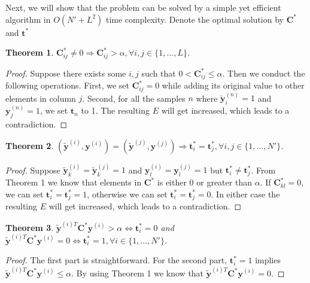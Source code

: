 \documentclass[10pt,twocolumn,letterpaper]{article}
\def\vec{\mathbf}
\def\mat{\mathbf}
\newtheorem{theorem}{Theorem}
\begin{document}
Next, we will show that the problem can be solved by a simple yet efficient algorithm in $O(N'+L^2)$ time complexity. Denote the optimal solution by $\mat{C}^*$ and $\vec{t}^*$
\begin{theorem}
$\mat{C}^*_{ij} \neq 0 \Rightarrow \mat{C}^*_{ij} > \alpha, \forall i,j \in \{1,\dots,L\}$.
\end{theorem}
\begin{proof}
Suppose there exists some $i,j$ such that $0 < \mat{C}^*_{ij} \leq \alpha$. Then we conduct the following operations. First, we set $\mat{C}^*_{ij}=0$ while adding its original value to other elements in column $j$. Second, for all the samples $n$ where $\tilde{\vec{y}}^{(n)}_i=1$ and $\vec{y}^{(n)}_j=1$, we set $\vec{t}_n$ to 1. The resulting $E$ will get increased, which leads to a contradiction.
\end{proof}
\begin{theorem}
$(\tilde{\vec{y}}^{(i)},\vec{y}^{(i)})=(\tilde{\vec{y}}^{(j)},\vec{y}^{(j)}) \Rightarrow \vec{t}^*_i=\vec{t}^*_j, \forall i,j \in \{1,\dots,N'\}$.
\end{theorem}
\begin{proof}
Suppose $\tilde{\vec{y}}^{(i)}_k=\tilde{\vec{y}}^{(j)}_k=1$ and $\vec{y}^{(i)}_l=\vec{y}^{(j)}_l=1$ but $\vec{t}^*_i \neq \vec{t}^*_j$. From Theorem 1 we know that elements in $\mat{C}^*$ is either 0 or greater than $\alpha$. If $\mat{C}^*_{kl}=0$, we can set $\vec{t}^*_i=\vec{t}^*_j=1$, otherwise we can set $\vec{t}^*_i=\vec{t}^*_j=0$. In either case the resulting $E$ will get increased, which leads to a contradiction.
\end{proof}
\begin{theorem}
$\tilde{\vec{y}}^{(i)T} \mat{C}^* \vec{y}^{(i)} > \alpha \Leftrightarrow \vec{t}^*_i=0$ and $\tilde{\vec{y}}^{(i)T} \mat{C}^* \vec{y}^{(i)} = 0 \Leftrightarrow \vec{t}^*_i=1, \forall i \in \{1,\dots,N'\}$.
\end{theorem}
\begin{proof}
The first part is straightforward. For the second part, $\vec{t}^*_i=1$ implies $\tilde{\vec{y}}^{(i)T} \mat{C}^* \vec{y}^{(i)} \leq \alpha$. By using Theorem 1 we know that $\tilde{\vec{y}}^{(i)T} \mat{C}^* \vec{y}^{(i)} = 0$.
\end{proof}
\end{document}
